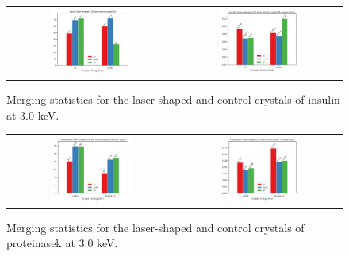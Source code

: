 \begin{figure}[h]
    \centering
    \begin{tabular}{cc}
    \includegraphics[width = 0.5\textwidth]{plots/exp2/ins_I_over_sigma.png} & \includegraphics[width = 0.5\textwidth]{plots/exp2/ins_rmerges.png}
    \end{tabular}
    \caption{Merging statistics for the laser-shaped and control crystals of insulin at 3.0 keV.}
    \label{fig:insulin}
\end{figure}

\begin{figure}[h]
    \centering
    \begin{tabular}{cc}
    \includegraphics[width = 0.5\textwidth]{plots/exp2/prot_I_over_sigma.png} & \includegraphics[width = 0.5\textwidth]{plots/exp2/prot_rmerges.png}
    \end{tabular}
    \caption{Merging statistics for the laser-shaped and control crystals of proteinasek at 3.0 keV.}
    \label{fig:proteinasek}
\end{figure}


